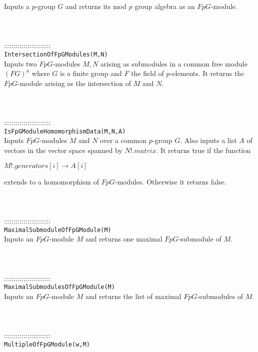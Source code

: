 \documentclass[a4paper,11pt]{report}
\begin{document}
{ Inputs a $p$-group $G$ and returns its mod $p$ group algebra as an $FpG$-module. \\
 \\
 \\
 \\
 ::::::::::::::::::::::::\\
 \texttt{IntersectionOfFpGModules(M,N) }\\
 

 Inputs two $FpG$-modules $M, N$ arising as submodules in a common free module $(FG)^n$ where $G$ is a finite group and $F$ the field of $p$-elements. It returns the $FpG$-module arising as the intersection of $M$ and $N$. \\
 \\
 \\
 \\
 ::::::::::::::::::::::::\\
 \texttt{IsFpGModuleHomomorphismData(M,N,A) }\\
 

 Inputs $FpG$-modules $M$ and $N$ over a common $p$-group $G$. Also inputs a list $A$ of vectors in the vector space spanned by $N!.matrix$. It returns true if the function 

 $ M!.generators[i] \longrightarrow A[i]$ 

 extends to a homomorphism of $FpG$-modules. Otherwise it returns false. \\
 \\
 \\
 \\
 ::::::::::::::::::::::::\\
 \texttt{MaximalSubmoduleOfFpGModule(M) }\\
 

 Inputs an $FpG$-module $M$ and returns one maximal $FpG$-submodule of $M$. \\
 \\
 \\
 \\
 ::::::::::::::::::::::::\\
 \texttt{MaximalSubmodulesOfFpGModule(M) }\\
 

 Inputs an $FpG$-module $M$ and returns the list of maximal $FpG$-submodules of $M$. \\
 \\
 \\
 \\
 ::::::::::::::::::::::::\\
 \texttt{MultipleOfFpGModule(w,M) }\\
 

}
\end{document}
